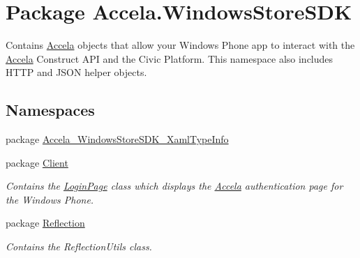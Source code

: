 \hypertarget{namespace_accela_1_1_windows_store_s_d_k}{\section{Package Accela.\+Windows\+Store\+S\+D\+K}
\label{namespace_accela_1_1_windows_store_s_d_k}
}


Contains \hyperlink{namespace_accela}{Accela} objects that allow your Windows Phone app to interact with the \hyperlink{namespace_accela}{Accela} Construct A\+P\+I and the Civic Platform. This namespace also includes H\+T\+T\+P and J\+S\+O\+N helper objects.  


\subsection*{Namespaces}
\begin{DoxyCompactItemize}
\item 
package \hyperlink{namespace_accela_1_1_windows_store_s_d_k_1_1_accela___windows_store_s_d_k___xaml_type_info}{Accela\+\_\+\+Windows\+Store\+S\+D\+K\+\_\+\+Xaml\+Type\+Info}
\item 
package \hyperlink{namespace_accela_1_1_windows_store_s_d_k_1_1_client}{Client}
\begin{DoxyCompactList}\small\item\em Contains the \hyperlink{class_accela_1_1_windows_store_s_d_k_1_1_client_1_1_login_page}{Login\+Page} class which displays the \hyperlink{namespace_accela}{Accela} authentication page for the Windows Phone. \end{DoxyCompactList}\item 
package \hyperlink{namespace_accela_1_1_windows_store_s_d_k_1_1_reflection}{Reflection}
\begin{DoxyCompactList}\small\item\em Contains the Reflection\+Utils class. \end{DoxyCompactList}\end{DoxyCompactItemize}
